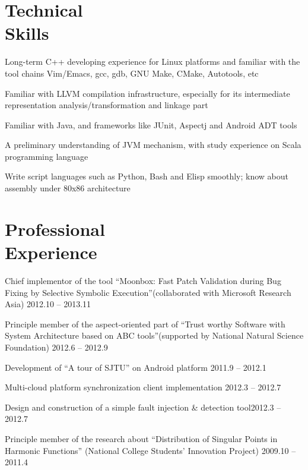 \documentclass[margin, line, 11pt]{resume}
\begin{document}
\begin{resume}
    \section{\mysidestyle Technical \\Skills}

    \begin{list2}
    \item Long-term C++ developing experience for Linux platforms and familiar with the tool chains Vim/Emacs, {gcc}, {gdb}, {GNU Make}, {CMake}, {Autotools}, etc
    \item Familiar with {LLVM} compilation infrastructure, especially for its intermediate representation analysis/transformation and linkage part
    \item Familiar with Java, and frameworks like {JUnit}, {Aspectj} and Android ADT tools
    \item A preliminary understanding of JVM mechanism, with study experience on Scala programming language
    \item Write script languages such as Python, Bash and Elisp smoothly; know about assembly under 80x86 architecture
    \end{list2}

    \section{\mysidestyle Professional \\Experience}
    \begin{list2}
    \item Chief implementor of the tool ``Moonbox: Fast Patch Validation during Bug Fixing by Selective Symbolic Execution''(collaborated with Microsoft Research Asia) \hfill 2012.10 -- 2013.11
    \item Principle member of the aspect-oriented part of ``Trust worthy Software with System Architecture based on ABC tools''(supported by National Natural Science Foundation) \hfill 2012.6 -- 2012.9
    \item Development of ``A tour of SJTU'' on Android platform \hfill 2011.9 -- 2012.1
    \item Multi-cloud platform synchronization client implementation \hfill 2012.3 -- 2012.7
    \item Design and construction of a simple fault injection \& detection tool\hfill 2012.3 -- 2012.7
    \item Principle member of the research about ``Distribution of Singular Points in Harmonic Functions'' (National College Students' Innovation Project) \hfill 2009.10 -- 2011.4
    \end{list2}
    

\end{resume}
\end{document}
